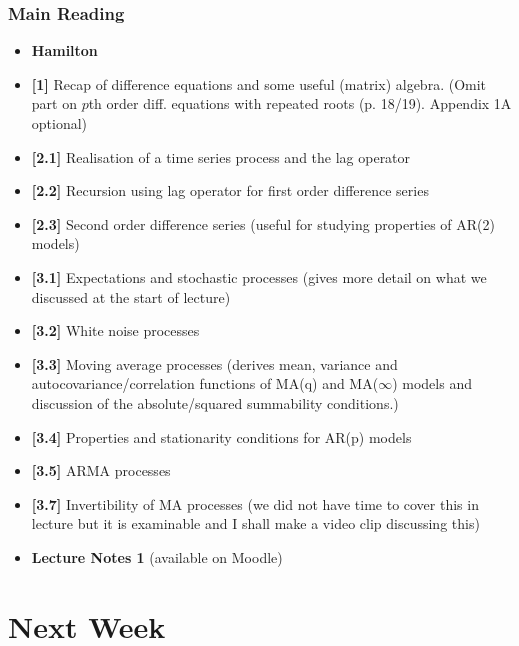 \documentclass{beamer}
\begin{document}
			\begin{frame}
	\frametitle{Main Reading}
	\begin{itemize}
		
		
		\item[] \textbf{Hamilton} 
		\item[] \textbf{[1]} Recap of difference equations and some useful (matrix) algebra. (Omit part on $p$th order diff. equations with repeated roots (p. 18/19). Appendix 1A optional)
		\item[] \textbf{[2.1]} Realisation of a time series process and the lag operator
		\item[] \textbf{[2.2]} Recursion using lag operator for first order difference series
		\item[]  \textbf{[2.3]} Second order difference series (useful for studying properties of AR(2) models)
		\item[] \textbf{[3.1]} Expectations and stochastic processes (gives more detail on what we discussed at the start of lecture)
		\item[] \textbf{[3.2]} White noise processes
		\item[]\textbf{[3.3]} Moving average processes (derives mean, variance and autocovariance/correlation functions of MA(q) and MA($\infty$) models and discussion of the absolute/squared summability conditions.)
		\item[] \textbf{[3.4]} Properties and stationarity conditions for AR(p) models
		\item[] \textbf{[3.5]} ARMA processes
		\item[] \textbf{[3.7]} Invertibility of MA processes (we did not have time to cover this in lecture but it is examinable and I shall make a video clip discussing this)
		
		
		\vspace{20pt}
		\item[] \textbf{Lecture Notes 1 }(available on Moodle)
		
\end{itemize}\end{frame}


			\section{Next Week}
			
\end{document}
